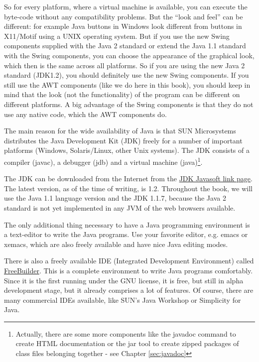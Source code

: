 So for every platform, where a virtual machine is available,
you can execute the byte-code without any compatibility problems.
But the ``look and feel'' can be different: for example Java buttons
in Windows look different from buttons in X11/Motif using a UNIX
operating system. But if you use the new Swing components supplied
with the Java 2 standard or extend the Java 1.1 standard with the Swing
components, you can choose the appearance of the graphical look, which then
is the same across all platforms. So if you are using the new Java 2 standard
(JDK1.2), you should definitely use the new Swing components. If you
still use the AWT components (like we do here in this book), you should
keep in mind that the look (not the functionality) 
of the program can be different on different platforms. 
A big advantage of the Swing components is that they do not use any
native code, which the AWT components do.

The main reason for the wide availability of Java
is that SUN Microsystems distributes the Java Development Kit (JDK)
freely for a number of important platforms (Windows, Solaris/Linux,
other Unix systems). The JDK consists of a compiler (javac), a
debugger (jdb) and a virtual machine (java)\footnote{Actually, there
are some more components like the javadoc command to create HTML
documentation or the jar tool to create zipped packages of
class files belonging together - see Chapter \ref{sec:javadoc}}.

The JDK can be downloaded from the Internet from the 
\href{http://www.javasoft.com}{JDK Javasoft link page}.
The latest version, as of the time of writing, is 1.2. 
Throughout the book,
we will use the Java 1.1 language version and the JDK 1.1.7,
because the Java 2 standard is not yet implemented in any JVM of the
web browsers available.

The only additional thing necessary to have a Java programming
environment is a text-editor to write the Java programs.
Use your favorite editor, e.g. emacs or xemacs, which are
also freely available and have nice Java editing modes.

There is also a freely available IDE (Integrated Development 
Environment) called \href{http://www.freebuilder.org/}{FreeBuilder}.
This is a complete environment to write Java programs comfortably.
Since it is the first running under the GNU license, it is free, but
still in alpha development stage, but it already comprises a lot of features. Of
course, there are many commercial IDEs available, like SUN's Java Workshop
or Simplicity for Java.


